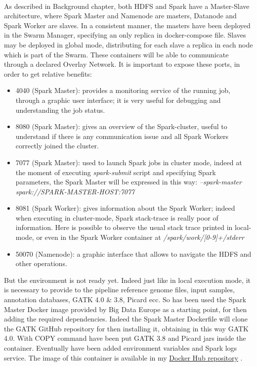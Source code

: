 \\[1\baselineskip]
As described in Background chapter, both HDFS and Spark have a Master-Slave architecture, where Spark Master and Namenode are masters, Datanode and Spark Worker are slaves. In a consistent manner, the masters have been deployed in the Swarm Manager, specifying an only replica in docker-compose file. Slaves may be deployed in global mode, distributing for each slave a replica in each node which is part of the Swarm. These containers will be able to communicate through a declared Overlay Network.\newline
It is important to expose these ports, in order to get relative benefits:
\begin{itemize}
  \item 4040 (Spark Master): provides a monitoring service of the running job, through a graphic user interface; it is very useful for debugging and understanding the job status.
  \item 8080 (Spark Master): gives an overview of the Spark-cluster, useful to understand if there is any communication issue and all Spark Workers correctly joined the cluster. 
  \item 7077 (Spark Master): used to launch Spark jobs in cluster mode, indeed at the moment of executing \textit{spark-submit} script and specifying Spark parameters, the Spark Master will be expressed in this way: \textit{--spark-master spark://SPARK-MASTER-HOST:7077}
  \item 8081 (Spark Worker): gives information about the Spark Worker; indeed when executing in cluster-mode, Spark stack-trace is really poor of information. Here is possible to observe the usual stack trace printed in local-mode, or even in the Spark Worker container at \textit{/spark/work/[0-9]+/stderr}
  \item 50070 (Namenode): a graphic interface that allows to navigate the HDFS and other operations.
\end{itemize}
But the environment is not ready yet. Indeed just like in local execution mode, it is necessary to provide to the pipeline reference genome files, input samples, annotation databases, GATK 4.0 \& 3.8, Picard ecc.\newline
So has been used the Spark Master Docker image provided by Big Data Europe as a starting point, for then adding the required dependencies. Indeed the Spark Master Dockerfile will clone the GATK GitHub repository for then installing it, obtaining in this way GATK 4.0. With COPY command have been put GATK 3.8 and Picard jars inside the container. Eventually have been added environment variables and Spark logs service. The image of this container is available in my \href{https://hub.docker.com/r/vzzarr/spark-master/}{Docker Hub repository} .\newline
